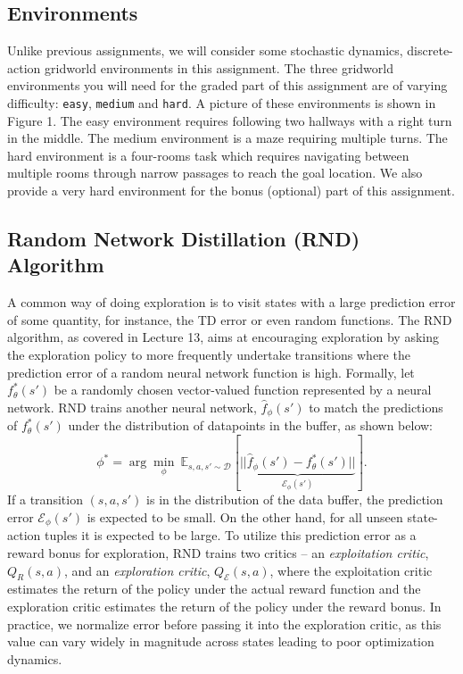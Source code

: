 \documentclass{article}
\begin{document}
\subsection{Environments}
Unlike previous assignments, we will consider some stochastic dynamics, discrete-action gridworld environments in this assignment. The three gridworld environments you will need for the graded part of this assignment are of varying difficulty: \texttt{easy}, \texttt{medium} and \texttt{hard}. A picture of these environments is shown in Figure 1. The easy environment requires following two hallways with a right turn in the middle. The medium environment is a maze requiring multiple turns. The hard environment is a four-rooms task which requires navigating between multiple rooms through narrow passages to reach the goal location. We also provide a very hard environment for the bonus (optional) part of this assignment.

\subsection{Random Network Distillation (RND) Algorithm}
A common way of doing exploration is to visit states with a large prediction error of some quantity, for instance, the TD error or even random functions. The RND algorithm, as covered in Lecture 13, aims at encouraging exploration by asking the exploration policy to more frequently undertake transitions where the prediction error of a random neural network function is high. Formally, let ${f}_\theta^*(s')$ be a randomly chosen vector-valued function represented by a neural network. RND trains another neural network, $\hat{f}_\phi(s')$ to match the predictions of $f^*_\theta(s')$ under the distribution of datapoints in the buffer, as shown below:
\begin{equation}
    \phi^* = \arg \min_\phi~ \mathbb{E}_{s, a, s' \sim \mathcal{D}} \left[\underbrace{||\hat{f}_\phi(s') - f^*_\theta(s')||}_{\mathcal{E}_\phi(s')} \right].
\end{equation}
If a transition $(s, a, s')$ is in the distribution of the data buffer, the prediction error $\mathcal{E}_\phi(s')$ is expected to be small. On the other hand, for all unseen state-action tuples it is expected to be large. To utilize this prediction error as a reward bonus for exploration, RND trains two critics -- an \emph{exploitation critic}, $Q_R(s, a)$, and an \emph{exploration critic}, $Q_\mathcal{E}(s, a)$, where the exploitation critic estimates the return of the policy under the actual reward function and the exploration critic estimates the return of the policy under the reward bonus. In practice, we normalize error before passing it into the exploration critic, as this value can vary widely in magnitude across states leading to poor optimization dynamics.
\end{document}
